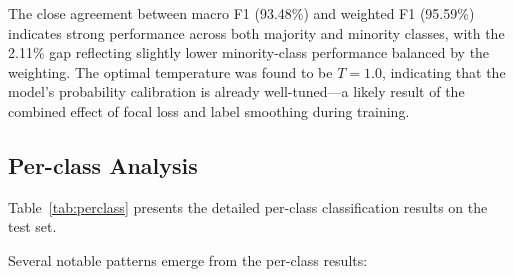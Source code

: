 \documentclass[conference, 10pt]{IEEEtran}
\begin{document}
The close agreement between macro F1 (93.48\%) and weighted F1 (95.59\%) indicates strong performance across both majority and minority classes, with the 2.11\% gap reflecting slightly lower minority-class performance balanced by the weighting. The optimal temperature was found to be $T = 1.0$, indicating that the model's probability calibration is already well-tuned—a likely result of the combined effect of focal loss and label smoothing during training.

\subsection{Per-class Analysis}

Table~\ref{tab:perclass} presents the detailed per-class classification results on the test set.

\begin{table}[t]
    \centering
    \caption{Per-class Test Set Performance}
    \label{tab:perclass}
\end{table}

Several notable patterns emerge from the per-class results:
\end{document}
